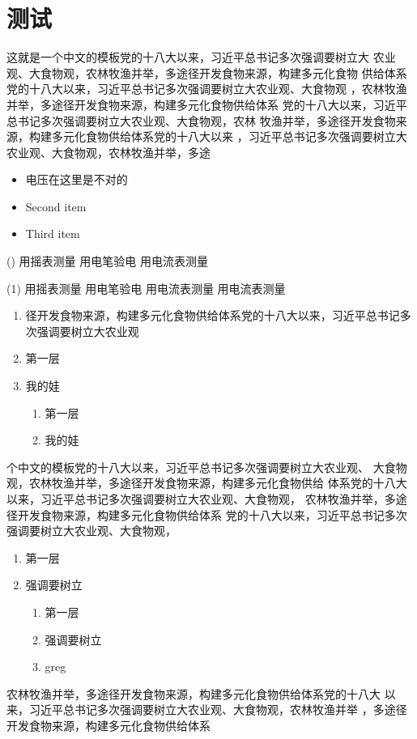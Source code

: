 \chapter{测试}

这就是一个中文的模板党的十八大以来，习近平总书记多次强调要树立大
农业观、大食物观，农林牧渔并举，多途径开发食物来源，构建多元化食物
供给体系党的十八大以来，习近平总书记多次强调要树立大农业观、大食物观
，农林牧渔并举，多途径开发食物来源，构建多元化食物供给体系
党的十八大以来，习近平总书记多次强调要树立大农业观、大食物观，农林
牧渔并举，多途径开发食物来源，构建多元化食物供给体系党的十八大以来
，习近平总书记多次强调要树立大农业观、大食物观，农林牧渔并举，多途
\begin{itemize}
	\kaishu
	\item 电压在这里是不对的
	\item Second item
	\item Third item
  \end{itemize}



  \begin{tasks}(\choosenum)
	\task 用摇表测量
	\task 用电笔验电
	\task 用电流表测量
\end{tasks}	

\begin{tasks}(1)
	\task 用摇表测量
	\task 用电笔验电
	\task 用电流表测量
	\task 用电流表测量
\end{tasks}	


  \begin{enumerate}
	\item  径开发食物来源，构建多元化食物供给体系党的十八大以来，习近平总书记多次强调要树立大农业观
	\item  第一层
	\item 我的娃
	\begin{enumerate}
		\item  第一层
		\item 我的娃
	\end{enumerate}
  \end{enumerate}
个中文的模板党的十八大以来，习近平总书记多次强调要树立大农业观、
大食物观，农林牧渔并举，多途径开发食物来源，构建多元化食物供给
体系党的十八大以来，习近平总书记多次强调要树立大农业观、大食物观，
农林牧渔并举，多途径开发食物来源，构建多元化食物供给体系
党的十八大以来，习近平总书记多次强调要树立大农业观、大食物观，

\begin{enumerate}[label=\arabic*., leftmargin=2cm]
	\item  第一层
	\item  强调要树立
	\begin{enumerate}[label=$\blacktriangle$., leftmargin=2em]
		\item  第一层
		\item  强调要树立
		\item greg
	\end{enumerate}
\end{enumerate}
农林牧渔并举，多途径开发食物来源，构建多元化食物供给体系党的十八大
以来，习近平总书记多次强调要树立大农业观、大食物观，农林牧渔并举
，多途径开发食物来源，构建多元化食物供给体系
